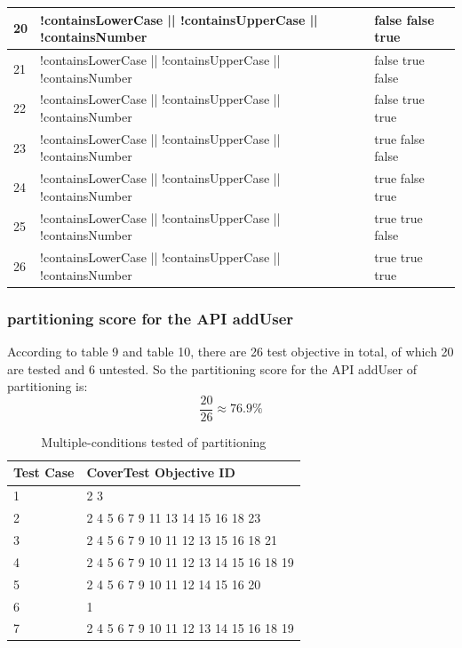 \documentclass{article}
\begin{document}
\begin{longtable}{|p{2cm}|p{10cm}|p{3cm}|}
\hline
20&!containsLowerCase || !containsUpperCase || !containsNumber&false false true\\
\hline
21&!containsLowerCase || !containsUpperCase || !containsNumber&false true false\\
\hline
22&!containsLowerCase || !containsUpperCase || !containsNumber&false true true\\
\hline
23&!containsLowerCase || !containsUpperCase || !containsNumber&true false false\\
\hline
24&!containsLowerCase || !containsUpperCase || !containsNumber&true false true\\
\hline
25&!containsLowerCase || !containsUpperCase || !containsNumber&true true false\\
\hline
26&!containsLowerCase || !containsUpperCase || !containsNumber&true true true\\
\hline
\end{longtable}

\subsubsection{partitioning score for the API addUser}
According to table 9 and table 10, there are 26 test objective in total, of which 20 are tested and 6 untested. So the partitioning score for the API addUser of partitioning is:
$$\frac{20}{26}\approx76.9\%$$
\begin{longtable}{|p{2cm}|p{8cm}|}
\caption{Multiple-conditions tested of partitioning}\\
\hline 
Test Case& CoverTest Objective ID\\
\hline  
1&2 3\\
\hline
2&2 4 5 6 7 9 11 13 14 15 16 18 23\\
\hline
3&2 4 5 6 7 9 10 11 12 13 15 16 18 21\\
\hline
4&2 4 5 6 7 9 10 11 12 13 14 15 16 18 19\\
\hline
5&2 4 5 6 7 9 10 11 12 14 15 16 20\\
\hline
6&1\\
\hline
7&2 4 5 6 7 9 10 11 12 13 14 15 16 18 19\\
\hline
\end{longtable}

\end{document}
